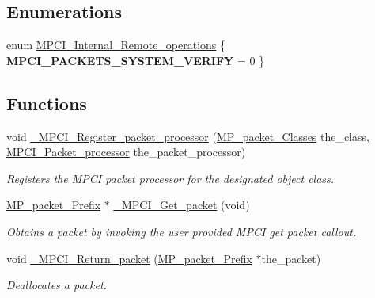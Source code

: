 \subsection*{Enumerations}
\begin{DoxyCompactItemize}
\item 
enum \mbox{\hyperlink{group__RTEMSScoreMPCI_ga04a2fa1c1617558e729e75700624cdb7}{M\+P\+C\+I\+\_\+\+Internal\+\_\+\+Remote\+\_\+operations}} \{ {\bfseries M\+P\+C\+I\+\_\+\+P\+A\+C\+K\+E\+T\+S\+\_\+\+S\+Y\+S\+T\+E\+M\+\_\+\+V\+E\+R\+I\+FY} = 0
 \}
\end{DoxyCompactItemize}
\subsection*{Functions}
\begin{DoxyCompactItemize}
\item 
void \mbox{\hyperlink{group__RTEMSScoreMPCI_gac273d577d3696588f86f26b1910a2f9c}{\+\_\+\+M\+P\+C\+I\+\_\+\+Register\+\_\+packet\+\_\+processor}} (\mbox{\hyperlink{group__RTEMSScoreMPPacket_gafed9717210f8917e5acb8e63f2c6bac3}{M\+P\+\_\+packet\+\_\+\+Classes}} the\+\_\+class, \mbox{\hyperlink{group__RTEMSScoreMPCI_gafc97753e25c76740b182f3e8cdf74cc8}{M\+P\+C\+I\+\_\+\+Packet\+\_\+processor}} the\+\_\+packet\+\_\+processor)
\begin{DoxyCompactList}\small\item\em Registers the M\+P\+CI packet processor for the designated object class. \end{DoxyCompactList}\item 
\mbox{\hyperlink{structMP__packet__Prefix}{M\+P\+\_\+packet\+\_\+\+Prefix}} $\ast$ \mbox{\hyperlink{group__RTEMSScoreMPCI_ga66e87499b1e505e2e38411619c88adce}{\+\_\+\+M\+P\+C\+I\+\_\+\+Get\+\_\+packet}} (void)
\begin{DoxyCompactList}\small\item\em Obtains a packet by invoking the user provided M\+P\+CI get packet callout. \end{DoxyCompactList}\item 
void \mbox{\hyperlink{group__RTEMSScoreMPCI_ga4921eb7c6291474df410b099381b09d9}{\+\_\+\+M\+P\+C\+I\+\_\+\+Return\+\_\+packet}} (\mbox{\hyperlink{structMP__packet__Prefix}{M\+P\+\_\+packet\+\_\+\+Prefix}} $\ast$the\+\_\+packet)
\begin{DoxyCompactList}\small\item\em Deallocates a packet. \end{DoxyCompactList}\item 

\end{DoxyCompactItemize}
